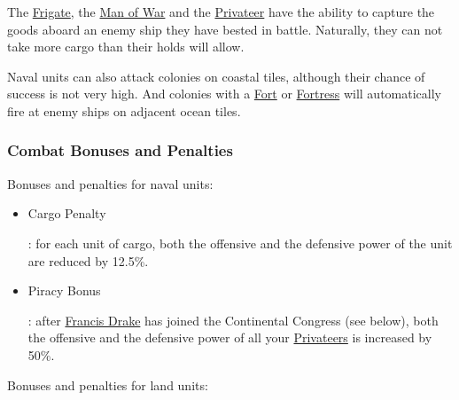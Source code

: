 \documentclass[12pt]{article}
\begin{document}
The \hyperlink{Frigate}{Frigate}, the \hyperlink{Man of War}{Man of
War} and the \hyperlink{Privateer}{Privateer} have the ability to
capture the goods aboard an enemy ship they have bested in
battle. Naturally, they can not take more cargo than their holds will
allow.

Naval units can also attack colonies on coastal tiles, although their
chance of success is not very high. And colonies with a
\hyperlink{Fort}{Fort} or \hyperlink{Fortress}{Fortress} will
automatically fire at enemy ships on adjacent ocean tiles.


\hypertarget{combat bonuses}{\subsubsection{Combat Bonuses and Penalties}}

Bonuses and penalties for naval units:

\begin{itemize}
\item \hypertarget{Cargo Penalty}{Cargo Penalty}: for each unit of
  cargo, both the offensive and the defensive power of the unit are
  reduced by 12.5\%.
\item \hypertarget{Piracy Bonus}{Piracy Bonus}: after
  \hyperlink{Francis Drake}{Francis Drake} has joined the Continental
  Congress (see below), both the offensive and the defensive power of
  all your \hyperlink{Privateer}{Privateers} is increased by 50\%.
\end{itemize}

Bonuses and penalties for land units:
\end{document}
